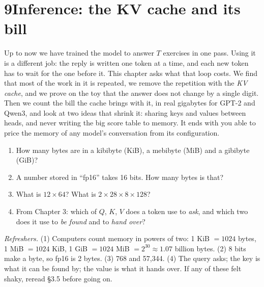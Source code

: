 \newpage
\section*{9\quad Inference: the KV cache and its bill}
\providecommand{\fitR}[1]{\leavevmode\setbox0\hbox{#1}\ifdim\wd0>\linewidth\resizebox{\linewidth}{!}{\box0}\else\box0\fi}

\begin{chaptermap}
Up to now we have trained the model to answer $T$ exercises in one pass. Using it is a different job: the
reply is written one token at a time, and each new token has to wait for the one before it. This chapter
asks what that loop costs. We find that most of the work in it is repeated, we remove the repetition with
the \emph{KV cache}, and we prove on the toy that the answer does not change by a single digit. Then we
count the bill the cache brings with it, in real gigabytes for GPT-2 and Qwen3, and look at two ideas that
shrink it: sharing keys and values between heads, and never writing the big score table to memory. It ends
with you able to price the memory of any model's conversation from its configuration.
\end{chaptermap}


\begin{beforeyoustart}
\begin{enumerate}[label=\arabic*.,leftmargin=1.6em]
\item How many bytes are in a kibibyte (KiB), a mebibyte (MiB) and a gibibyte (GiB)?
\item A number stored in ``fp16'' takes 16 bits. How many bytes is that?
\item What is $12 \times 64$? What is $2 \times 28 \times 8 \times 128$?
\item From Chapter 3: which of $Q$, $K$, $V$ does a token use to \emph{ask}, and which two does it use to
\emph{be found} and to \emph{hand over}?
\end{enumerate}
\textit{Refreshers.} (1) Computers count memory in powers of two: 1 KiB $= 1024$ bytes, 1 MiB $= 1024$ KiB,
1 GiB $= 1024$ MiB $= 2^{30} \approx 1.07$ billion bytes. (2) 8 bits make a byte, so fp16 is 2 bytes.
(3) 768 and 57{,}344. (4) The query asks; the key is what it can be found by; the value is what it hands
over. If any of these felt shaky, reread \S3.5 before going on.
\end{beforeyoustart}

